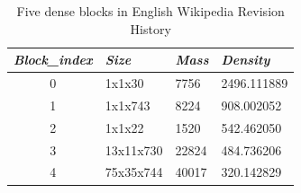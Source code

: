 \renewcommand{\arraystretch}{1.4}
\begin{table}[h!t]
\centering
\caption{Five dense blocks in English Wikipedia Revision History}
\label{tab:wikipedia}
\begin{tabular}{|c|p{2cm}|p{2cm}|p{3cm}|}
\hline
\textit{\textbf{Block\_index}} & \textit{\textbf{Size}} & \textit{\textbf{Mass}} & \textit{\textbf{Density}} \\ \hline
{0}                     & 1x1x30                 & 7756                               & 2496.111889                           \\ \hline
{1}                     & 1x1x743                 & 8224                               & 908.002052                           \\ \hline
{2}                     & 1x1x22                 & 1520                               & 542.462050                          \\ \hline
{3}                     & 13x11x730                  & 22824                                & 484.736206                           \\ \hline
{4}                     & 75x35x744                 & 40017                               & 320.142829                           \\ \hline
\end{tabular}
\end{table}
